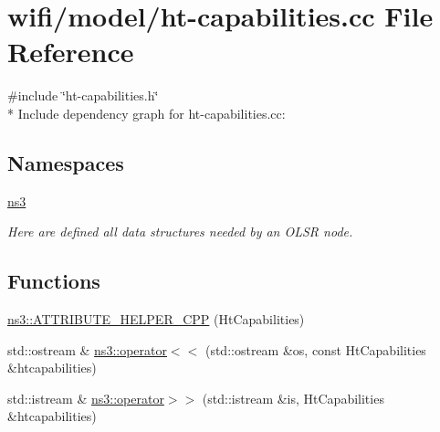 \hypertarget{ht-capabilities_8cc}{}\section{wifi/model/ht-\/capabilities.cc File Reference}
\label{ht-capabilities_8cc}
{\ttfamily \#include \char`\"{}ht-\/capabilities.\+h\char`\"{}}\\*
Include dependency graph for ht-\/capabilities.cc\+:
\subsection*{Namespaces}
\begin{DoxyCompactItemize}
\item 
 \hyperlink{namespacens3}{ns3}
\begin{DoxyCompactList}\small\item\em Here are defined all data structures needed by an O\+L\+SR node. \end{DoxyCompactList}\end{DoxyCompactItemize}
\subsection*{Functions}
\begin{DoxyCompactItemize}
\item 
\hyperlink{namespacens3_a89e697060778041c0796aae6e512046d}{ns3\+::\+A\+T\+T\+R\+I\+B\+U\+T\+E\+\_\+\+H\+E\+L\+P\+E\+R\+\_\+\+C\+PP} (Ht\+Capabilities)
\item 
std\+::ostream \& \hyperlink{namespacens3_ae608ccb16fe4813a35f5b630ec934c2e}{ns3\+::operator$<$$<$} (std\+::ostream \&os, const Ht\+Capabilities \&htcapabilities)
\item 
std\+::istream \& \hyperlink{namespacens3_a45c708b54a352ab44ae5dcfdbc7a315a}{ns3\+::operator$>$$>$} (std\+::istream \&is, Ht\+Capabilities \&htcapabilities)
\end{DoxyCompactItemize}
